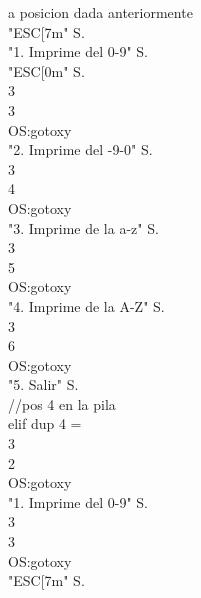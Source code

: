 \documentclass[conference]{IEEEtran}
\begin{document}
\begin{enumerate}
\begin{center}
a posicion dada anteriormente \\ "ESC[7m" S. \\ "1. Imprime del 0-9" S. \\ "ESC[0m" S. \\ 3 \\ 3 \\ OS:gotoxy \\ "2. Imprime del -9-0" S. \\ 3 \\ 4 \\ OS:gotoxy \\ "3. Imprime de la a-z" S. \\ 3 \\ 5 \\ OS:gotoxy \\ "4. Imprime de la A-Z" S. \\ 3 \\ 6 \\ OS:gotoxy \\ "5. Salir" S. \\ //pos 4 en la pila \\ elif dup 4 = \\ 3 \\ 2 \\ OS:gotoxy \\ "1. Imprime del 0-9" S. \\ 3 \\ 3 \\ OS:gotoxy \\ "ESC[7m" S. \\
	

\end{center}
\end{enumerate}
\end{document}
